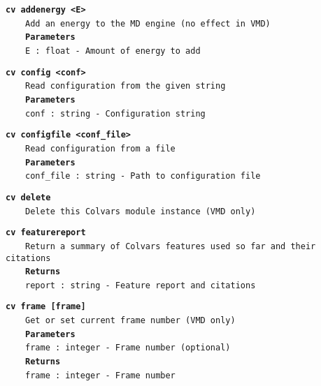 \begin{mdexampleinput}{}
\texttt{\textbf{cv addenergy <E>}}
\\
\-~~~~\texttt{Add an energy to the MD engine (no effect in VMD)}
\\
\-~~~~\texttt{\textbf{Parameters}}
\\
\-~~~~\texttt{E : float - Amount of energy to add}
\end{mdexampleinput}
\begin{mdexampleinput}{}
\texttt{\textbf{cv config <conf>}}
\\
\-~~~~\texttt{Read configuration from the given string}
\\
\-~~~~\texttt{\textbf{Parameters}}
\\
\-~~~~\texttt{conf : string - Configuration string}
\end{mdexampleinput}
\begin{mdexampleinput}{}
\texttt{\textbf{cv configfile <conf\_file>}}
\\
\-~~~~\texttt{Read configuration from a file}
\\
\-~~~~\texttt{\textbf{Parameters}}
\\
\-~~~~\texttt{conf\_file : string - Path to configuration file}
\end{mdexampleinput}
\begin{mdexampleinput}{}
\texttt{\textbf{cv delete}}
\\
\-~~~~\texttt{Delete this Colvars module instance (VMD only)}
\end{mdexampleinput}
\begin{mdexampleinput}{}
\texttt{\textbf{cv featurereport}}
\\
\-~~~~\texttt{Return a summary of Colvars features used so far and their citations}
\\
\-~~~~\texttt{\textbf{Returns}}
\\
\-~~~~\texttt{report : string - Feature report and citations}
\end{mdexampleinput}
\begin{mdexampleinput}{}
\texttt{\textbf{cv frame [frame]}}
\\
\-~~~~\texttt{Get or set current frame number (VMD only)}
\\
\-~~~~\texttt{\textbf{Parameters}}
\\
\-~~~~\texttt{frame : integer - Frame number (optional)}
\\
\-~~~~\texttt{\textbf{Returns}}
\\
\-~~~~\texttt{frame : integer - Frame number}
\end{mdexampleinput}
